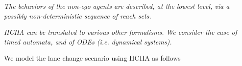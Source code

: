 {\it The behaviors of the non-ego agents are described, at the lowest level, via a possibly non-deterministic sequence of reach sets.}

{\it HCHA can be translated to various other formalisms. We consider the case of timed automata, and of ODEs (i.e. dynamical systems).}

\begin{exmp}
	We model the lane change scenario using HCHA as follows
	\end{exmp}
